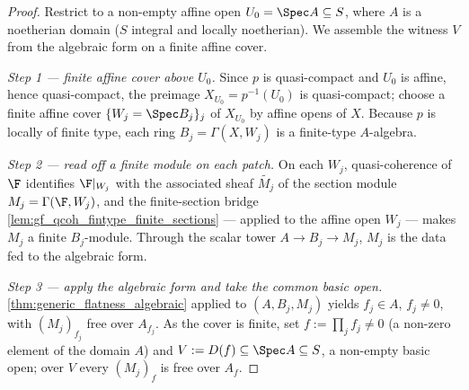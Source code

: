 \begin{proof}
        \leanok
  Restrict to a non-empty affine open \(U_0 = \Spec A \subseteq S\), where \(A\) is a
  noetherian domain (\(S\) integral and locally noetherian). We assemble the witness
  \(V\) from the algebraic form on a finite affine cover.

  \emph{Step 1 — finite affine cover above \(U_0\).} Since \(p\) is quasi-compact and
  \(U_0\) is affine, hence quasi-compact, the preimage \(X_{U_0} = p^{-1}(U_0)\) is
  quasi-compact; choose a
  finite affine cover \(\{W_j = \Spec B_j\}_{j}\) of \(X_{U_0}\) by affine opens of
  \(X\). Because \(p\) is locally of finite type, each ring \(B_j = \Gamma(X, W_j)\)
  is a finite-type \(A\)-algebra.

  \emph{Step 2 — read off a finite module on each patch.} On each \(W_j\), quasi-coherence
  of \(\F\) identifies \(\F|_{W_j}\) with the associated sheaf \(\widetilde{M_j}\) of the
  section module \(M_j = \Gamma(\F, W_j)\), and the finite-section bridge
  \cref{lem:gf_qcoh_fintype_finite_sections} — applied to the affine open \(W_j\) — makes
  \(M_j\) a finite \(B_j\)-module. Through the scalar tower \(A \to B_j \to M_j\),
  \(M_j\) is the data fed to the algebraic form.

  \emph{Step 3 — apply the algebraic form and take the common basic open.}
  \cref{thm:generic_flatness_algebraic} applied to \((A, B_j, M_j)\) yields \(f_j \in A\),
  \(f_j \ne 0\), with \((M_j)_{f_j}\) free over \(A_{f_j}\). As the cover is finite, set
  \(f := \prod_j f_j \ne 0\) (a non-zero element of the domain \(A\)) and
  \(V := D(f) \subseteq \Spec A \subseteq S\), a non-empty basic open; over \(V\) every
  \((M_j)_f\) is free over \(A_f\).


\end{proof}
